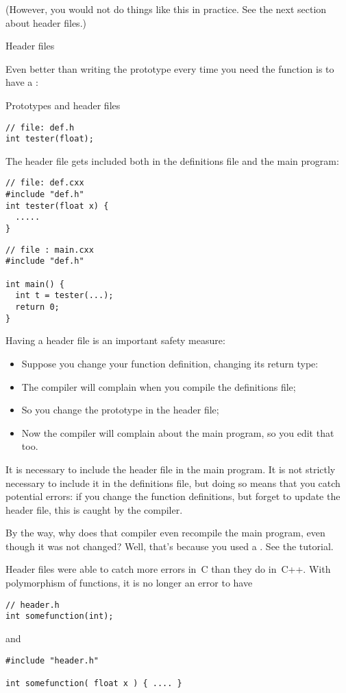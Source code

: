 (However, you would not do things like this in practice. See the next
section about header files.)

 {Header files}
\label{sec:hfile}

Even better than writing the prototype every time you need the
function is to have a :

\begin{block}{Prototypes and header files}
  \label{sl:proto-header}
\begin{verbatim}
// file: def.h
int tester(float);
\end{verbatim}
The header file gets included both in the definitions file and the
main program:
\begin{multicols}{2}  
\begin{verbatim}
// file: def.cxx
#include "def.h"
int tester(float x) {
  .....
}
\end{verbatim}
\vfill\columnbreak
\begin{verbatim}
// file : main.cxx
#include "def.h"

int main() {
  int t = tester(...);
  return 0;
}
\end{verbatim}
\end{multicols}
\end{block}

Having a header file is an important safety measure:
\begin{itemize}
\item Suppose you change your function definition, changing its return
  type:
\item The compiler will complain when you compile the definitions
  file;
\item So you change the prototype in the header file;
\item Now the compiler will complain about the main program, so you
  edit that too.
\end{itemize}

It is necessary to include the header file in the main program. It is
not strictly necessary to include it in the definitions file, but
doing so means that you catch potential errors: if you change the
function definitions, but forget to update the header file, this is
caught by the compiler.

\begin{remark}
  By the way, why does that compiler even recompile the main program,
  even though it was not changed? Well, that's because you used a
  . See the tutorial.
\end{remark}
\begin{remark}
  Header files were able to catch more errors in~C than they do
  in~C++. With polymorphism of functions, it is no longer an error to
  have 
\begin{verbatim}
// header.h
int somefunction(int);
\end{verbatim}
and
\begin{verbatim}
#include "header.h"

int somefunction( float x ) { .... }
\end{verbatim}
\end{remark}

